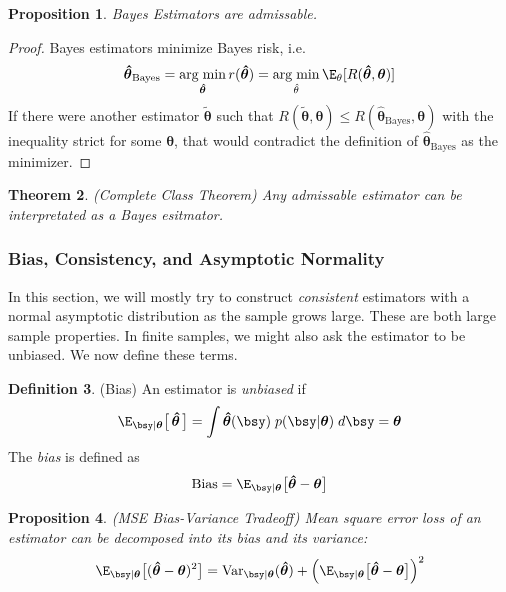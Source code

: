 \documentclass[12pt]{article}
\theoremstyle{plain}
\newtheorem{thm}{Theorem}[section]
\newtheorem{prop}[thm]{Proposition}
\theoremstyle{definition}
\newtheorem{defn}[thm]{Definition}
\theoremstyle{remark}
\newcommand{\bstheta}{\boldsymbol{\theta}}
\newcommand{\bshattheta}{\boldsymbol{\hat{\theta}}}
\newcommand{\bstildetheta}{\boldsymbol{\tilde{\theta}}}
\DeclareMathOperator*{\argmin}{arg\;min}
\newcommand{\Var}{\operatorname{Var}}
\begin{document}
\begin{prop}
Bayes Estimators are admissable.
\end{prop}
\begin{proof}
Bayes estimators minimize Bayes risk, i.e.
\begin{align*}
  \bshattheta_\text{Bayes}
  = \argmin_{\bshattheta} r(\bshattheta)
  = \argmin_{\hat{\theta}}\E_\theta[R(\bshattheta,\bstheta)]
\end{align*}
If there were another estimator $\bstildetheta$ such that
$R(\bstildetheta,\bstheta)\leq R(\bshattheta_\text{Bayes},\bstheta)$
with the inequality strict for some $\bstheta$, that would contradict
the definition of $\bshattheta_\text{Bayes}$ as the minimizer.
\end{proof}

\begin{thm}\emph{(Complete Class Theorem)}
Any admissable estimator can be interpretated as a Bayes esitmator.
\end{thm}


\clearpage
\subsubsection{Bias, Consistency, and Asymptotic Normality}

In this section, we will mostly try to construct \emph{consistent}
estimators with a normal asymptotic distribution as the sample grows
large. These are both large sample properties. In finite samples, we
might also ask the estimator to be unbiased. We now define these terms.

\begin{defn}(Bias)
An estimator is \emph{unbiased} if
\begin{align*}
  \E_{\bsy|\bstheta}\big[\,\bshattheta\,\big]
  =
  \int
    \bshattheta(\bsy) \;
    p(\bsy|\bstheta) \; d\bsy = \bstheta
\end{align*}
The \emph{bias} is defined as
\begin{align*}
  \text{Bias} = \E_{\bsy|\bstheta}\big[\bshattheta-\bstheta\big]
\end{align*}
\end{defn}

\begin{prop}\emph{(MSE Bias-Variance Tradeoff)}
Mean square error loss of an estimator can be decomposed into its bias
and its variance:
\begin{align*}
  \E_{\bsy|\bstheta}\big[(\bshattheta-\bstheta)^2\big]
  =\Var_{\bsy|\bstheta}(\bshattheta) +
  \left(\E_{\bsy|\bstheta}\big[\bshattheta-\bstheta\big]\right)^2
\end{align*}
\end{prop}
\end{document}
